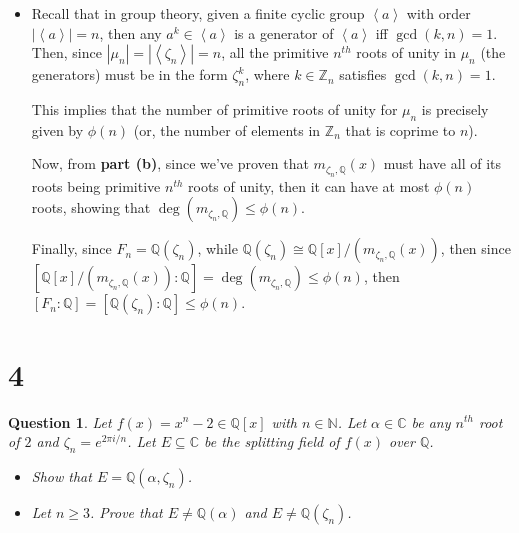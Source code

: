 \documentclass{article}
\newtheorem{question}{Question}
\begin{document}
\begin{itemize}
    \hfil

    \item[(c)] Recall that in group theory, given a finite cyclic group $\left<a\right>$ with order $|\left<a\right>|=n$, then any $a^k\in \left<a\right>$ is a generator of $\left<a\right>$ iff $\gcd(k,n)=1$.
    Then, since $|\mu_n|=|\left<\zeta_n\right>|=n$, all the primitive $n^{th}$ roots of unity in $\mu_n$ (the generators) must be in the form $\zeta_n^k$, where $k\in\mathbb{Z}_n$ satisfies $\gcd(k,n)=1$.

    This implies that the number of primitive roots of unity for $\mu_n$ is precisely given by $\phi(n)$ (or, the number of elements in $\mathbb{Z}_n$ that is coprime to $n$).

    Now, from \textbf{part (b)}, since we've proven that $m_{\zeta_n,\mathbb{Q}}(x)$ must have all of its roots being primitive $n^{th}$ roots of unity,
    then it can have at most $\phi(n)$ roots, showing that $\deg(m_{\zeta_n,\mathbb{Q}})\leq \phi(n)$.

    Finally, since $F_n=\mathbb{Q}(\zeta_n)$, while $\mathbb{Q}(\zeta_n)\cong \mathbb{Q}[x]/(m_{\zeta_n,\mathbb{Q}}(x))$, then since $[\mathbb{Q}[x]/(m_{\zeta_n,\mathbb{Q}}(x)):\mathbb{Q}]=\deg(m_{\zeta_n,\mathbb{Q}})\leq \phi(n)$,
    then $[F_n:\mathbb{Q}]=[\mathbb{Q}(\zeta_n):\mathbb{Q}]\leq \phi(n)$.
    
\end{itemize}

\break

\section*{4}
\begin{myBox}[]{}
    \begin{question}
        Let $f(x)=x^n-2\in\mathbb{Q}[x]$ with $n\in\mathbb{N}$. Let $\alpha\in\mathbb{C}$ be any $n^{th}$ root of $2$ and $\zeta_n=e^{2\pi i/n}$.
        Let $E\subseteq\mathbb{C}$ be the splitting field of $f(x)$ over $\mathbb{Q}$.
        \begin{itemize}
            \item[(a)] Show that $E=\mathbb{Q}(\alpha,\zeta_n)$.
            \item[(b)] Let $n\geq 3$. Prove that $E\neq\mathbb{Q}(\alpha)$ and $E\neq\mathbb{Q}(\zeta_n)$. 
        \end{itemize}
    \end{question}
\end{myBox}
\end{document}
